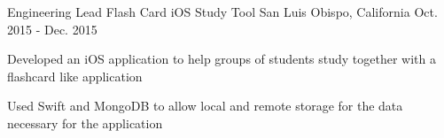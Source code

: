 \begin{cventries}
\cventry
{Engineering Lead} %
{Flash Card iOS Study Tool} %
{San Luis Obispo, California} %
{Oct. 2015 - Dec. 2015} %
{ %
\begin{cvitems}
\item {Developed an iOS application to help groups of students study together with a flashcard like application}
\item {Used Swift and MongoDB to allow local and remote storage for the data necessary for the application}
\end{cvitems}
}













\end{cventries}
